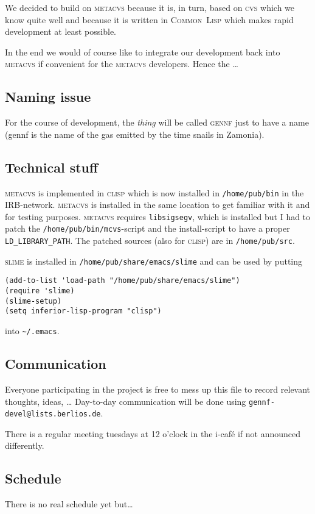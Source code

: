 \documentclass[fleqn, 10pt, a4paper]{article}
\begin{document}
We decided to build on \textsc{metacvs} because it is, in turn, based on
\textsc{cvs} which we know quite well and because it is written in
\textsc{Common~Lisp} which makes rapid development at least possible.

In the end we would of course like to integrate our development back
into \textsc{metacvs} if convenient for the \textsc{metacvs} developers.
Hence the \ldots

\subsection{Naming issue}
For the course of development, the \emph{thing} will be called
\textsc{gennf} just to have a name (gennf is the name of the gas emitted
by the time snails in Zamonia).

\subsection{Technical stuff}
\textsc{metacvs} is implemented in \textsc{clisp} which is now installed
in \texttt{/home/pub/bin} in the IRB-network. \textsc{metacvs} is
installed in the same location to get familiar with it and for testing
purposes. \textsc{metacvs} requires \texttt{libsigsegv}, which is
installed but I had to patch the \texttt{/home/pub/bin/mcvs}-script and
the install-script to have a proper \texttt{LD\_LIBRARY\_PATH}. The
patched sources (also for \textsc{clisp}) are in \texttt{/home/pub/src}.

\textsc{slime} is installed in \texttt{/home/pub/share/emacs/slime} and
can be used by putting
\begin{verbatim}
(add-to-list 'load-path "/home/pub/share/emacs/slime")
(require 'slime)
(slime-setup)
(setq inferior-lisp-program "clisp")
\end{verbatim}

into \texttt{\textasciitilde/.emacs}.

\subsection{Communication}
Everyone participating in the project is free to mess up this file to
record relevant thoughts, ideas, \ldots
Day-to-day communication will be done using
\texttt{gennf-devel@lists.berlios.de}.

There is a regular meeting tuesdays at 12 o'clock in the i-caf\'e if
not announced differently.

\subsection{Schedule \label{schedule}}
There is no real schedule yet but\ldots
\end{document}
